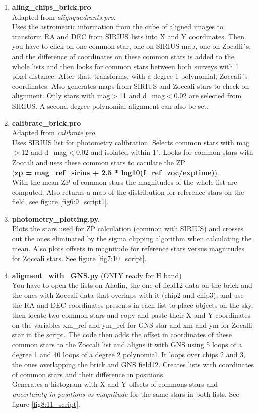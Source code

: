 \documentclass[4paper,11pt]{report}
\begin{document}
\begin{enumerate}
\item \textbf{aling\_chips\_brick.pro} \\
Adapted from \textit{alignquadrants.pro}.\\
Uses the astrometric information from the cube of aligned images to transform RA and DEC from SIRIUS lists into X and Y coordinates. Then you have to click on one common star, one on SIRIUS map, one on Zocalli´s, and the difference of coordinates on these common stars is added to the whole lists and then looks for common stars between both surveys with 1 pixel distance. After that, transforms, with  a degree 1 polynomial, Zoccali´s coordinates. Also generates maps from SIRIUS and Zoccali stars to check on alignment.  Only stars with mag$>$11 and d\_mag$<$0.02 are selected from SIRIUS.
A second degree polynomial alignment can also be set.  
\item \textbf{calibrate\_brick.pro } \\
Adapted from \textit{calibrate.pro}.\\
Uses SIRIUS list for photometry calibration. Selects common stars with mag$>$12 and d\_mag$<$0.02 and isolated  within 1". Looks for common stars with Zoccali and uses these common stars to caculate the ZP\\ (\textbf{zp = mag\_ref\_sirius + 2.5 * log10(f\_ref\_zoc/exptime)}).\\With the mean ZP of common stars the magnitudes of the whole list are computed. Also returns a map of the distribution for reference stars on the field, see figure \ref{fig6:9_script1}.
\item \textbf{photometry\_plotting.py.} \\
Plots the stars used for ZP calculation (common with SIRIUS) and crosses out the ones eliminated by the sigma clipping algorithm when calculating the mean. Also plots offsets in magnitude for reference stars versus magnitudes for  Zoccali  stars. See figure \ref{fig7:10_script}.

\item \textbf{aligment\_with\_GNS.py} (ONLY ready for H band) \\
You have to open the lists on Aladin, the one of field12 data on the brick and the ones with Zoccali data that overlaps with it (chip2 and chip3), and use the RA and DEC coordinates presents in each list to place objects on the sky, then locate two common stars and copy and paste their X and Y coordinates on the variables xm\_ref and ym\_ref for GNS star and xm and ym for Zocalli star in the script. The code then adds the offset in coordinates of these common stars to the Zoccali list and aligns it with GNS using 5 loops of a degree 1 and 40 loops of a degree 2 polynomial. It loops over chips 2 and 3, the ones overlapping the brick and GNS field12. Creates lists with coordinates of common stars and their difference in positions.\\
Generates a histogram with X and Y offsets of commons stars and \textit{uncertainty in positions vs magnitude} for the same stars in both lists. See figure \ref{fig8:11_script}.

\end{enumerate} 
\end{document}
